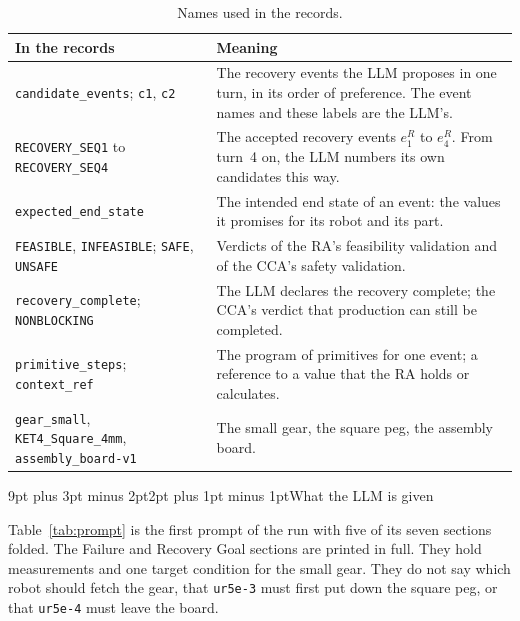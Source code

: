 \documentclass[preprint,12pt,authoryear]{elsarticle}
\makeatletter
\renewcommand\subsection{\@startsection{subsection}{2}{\z@}%
  {9pt plus 3pt minus 2pt}{2pt plus 1pt minus 1pt}{\normalsize\bfseries}}
\let\code\nolinkurl
\makeatother
\begin{document}
\begin{table}[H]
\centering\footnotesize
\setlength{\tabcolsep}{5pt}
\begin{tabularx}{\linewidth}{@{}>{\raggedright\arraybackslash}p{5.9cm} Y@{}}
\toprule
In the records & Meaning \\
\midrule
\code{candidate_events}; \code{c1}, \code{c2} & The recovery events the LLM proposes in one turn, in its order of preference. The event names and these labels are the LLM's. \\
\code{RECOVERY_SEQ1} to \code{RECOVERY_SEQ4} & The accepted recovery events $e^R_1$ to $e^R_4$. From turn~4 on, the LLM numbers its own candidates this way. \\
\code{expected_end_state} & The intended end state of an event: the values it promises for its robot and its part. \\
\code{FEASIBLE}, \code{INFEASIBLE}; \code{SAFE}, \code{UNSAFE} & Verdicts of the RA's feasibility validation and of the CCA's safety validation. \\
\code{recovery_complete}; \code{NONBLOCKING} & The LLM declares the recovery complete; the CCA's verdict that production can still be completed. \\
\code{primitive_steps}; \code{context_ref} & The program of primitives for one event; a reference to a value that the RA holds or calculates. \\
\code{gear_small}, \code{KET4_Square_4mm}, \code{assembly_board-v1} & The small gear, the square peg, the assembly board. \\
\bottomrule
\end{tabularx}
\caption{Names used in the records.}\label{tab:names}
\end{table}

\subsection{What the LLM is given}

Table~\ref{tab:prompt} is the first prompt of the run with five of its seven sections folded.
The Failure and Recovery Goal sections are printed in full. They hold measurements and one
target condition for the small gear. They do not say which robot should fetch the gear, that
\code{ur5e-3} must first put down the square peg, or that \code{ur5e-4} must leave the board.
\end{document}
